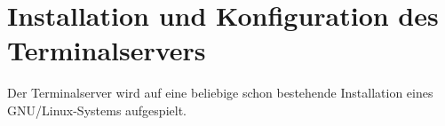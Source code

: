 \chapter{Installation und Konfiguration des Terminalservers}
Der Terminalserver wird auf eine beliebige schon bestehende Installation eines 
GNU/Linux-Systems aufgespielt.
  
